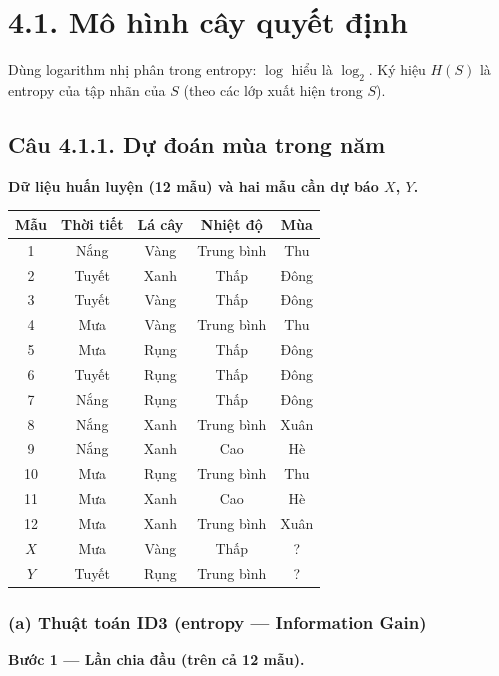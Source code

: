 \section*{4.1. Mô hình cây quyết định}

Dùng logarithm nhị phân trong entropy: \(\log\) hiểu là \(\log_2\).
Ký hiệu \(H(S)\) là entropy của tập nhãn của \(S\) (theo các lớp xuất hiện trong \(S\)).

\subsection*{Câu 4.1.1. Dự đoán mùa trong năm}

\textbf{Dữ liệu huấn luyện (12 mẫu) và hai mẫu cần dự báo \(X\), \(Y\).}

\begin{center}
{\small
\begin{tabular}{@{}ccccc@{}}\toprule
Mẫu & Thời tiết & Lá cây & Nhiệt độ & Mùa\\\midrule
1 & Nắng & Vàng & Trung bình & Thu\\
2 & Tuyết & Xanh & Thấp & Đông\\
3 & Tuyết & Vàng & Thấp & Đông\\
4 & Mưa & Vàng & Trung bình & Thu\\
5 & Mưa & Rụng & Thấp & Đông\\
6 & Tuyết & Rụng & Thấp & Đông\\
7 & Nắng & Rụng & Thấp & Đông\\
8 & Nắng & Xanh & Trung bình & Xuân\\
9 & Nắng & Xanh & Cao & Hè\\
10 & Mưa & Rụng & Trung bình & Thu\\
11 & Mưa & Xanh & Cao & Hè\\
12 & Mưa & Xanh & Trung bình & Xuân\\
\(X\) & Mưa & Vàng & Thấp & ?\\
\(Y\) & Tuyết & Rụng & Trung bình & ?\\
\bottomrule
\end{tabular}
}
\end{center}

\subsubsection*{(a) Thuật toán ID3 (entropy --- Information Gain)}

\textbf{Bước 1 --- Lần chia đầu (trên cả 12 mẫu).}

